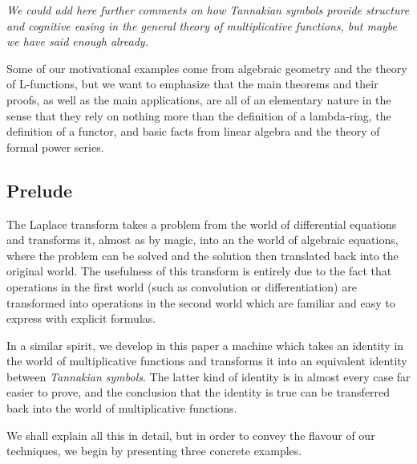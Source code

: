 \emph{We could add here further comments on how Tannakian symbols provide structure and cognitive easing in the general theory of multiplicative functions, but maybe we have said enough already.}

Some of our motivational examples come from algebraic geometry and the theory of L-functions, but we want to emphasize that the main theorems and their proofs, as well as the main applications, are all of an elementary nature in the sense that they rely on nothing more than the definition of a lambda-ring, the definition of a functor, and basic facts from linear algebra and the theory of formal power series.

\subsection{Prelude}

The Laplace transform takes a problem from the world of differential equations and transforms it, almost as by magic, into an the world of algebraic equations, where the problem can be solved and the solution then translated back into the original world. The usefulness of this transform is entirely due to the fact that operations in the first world (such as convolution or differentiation) are transformed into operations in the second world which are familiar and easy to express with explicit formulas.

In a similar spirit, we develop in this paper a machine which takes an identity in the world of multiplicative functions and transforms it into an equivalent identity between \emph{Tannakian symbols}. The latter kind of identity is in almost every case far easier to prove, and the conclusion that the identity is true can be transferred back into the world of multiplicative functions.

We shall explain all this in detail, but in order to convey the flavour of our techniques, we begin by presenting three concrete examples. 

